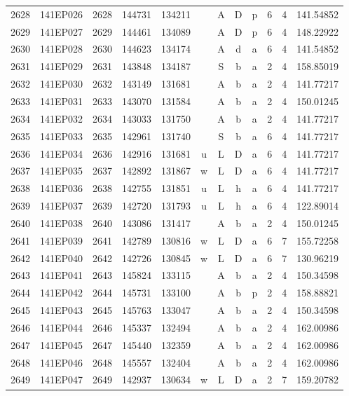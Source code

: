 \begin{tabular}{|*{12}{c|}}
2628 & 141EP026 & 2628 & 144731 & 134211 &  & A & D & p & 6 & 4 & 141.54852 \\ 
2629 & 141EP027 & 2629 & 144461 & 134089 &  & A & D & p & 6 & 4 & 148.22922 \\ 
2630 & 141EP028 & 2630 & 144623 & 134174 &  & A & d & a & 6 & 4 & 141.54852 \\ 
2631 & 141EP029 & 2631 & 143848 & 134187 &  & S & b & a & 2 & 4 & 158.85019 \\ 
2632 & 141EP030 & 2632 & 143149 & 131681 &  & A & b & a & 2 & 4 & 141.77217 \\ 
2633 & 141EP031 & 2633 & 143070 & 131584 &  & A & b & a & 2 & 4 & 150.01245 \\ 
2634 & 141EP032 & 2634 & 143033 & 131750 &  & A & b & a & 2 & 4 & 141.77217 \\ 
2635 & 141EP033 & 2635 & 142961 & 131740 &  & S & b & a & 6 & 4 & 141.77217 \\ 
2636 & 141EP034 & 2636 & 142916 & 131681 & u & L & D & a & 6 & 4 & 141.77217 \\ 
2637 & 141EP035 & 2637 & 142892 & 131867 & w & L & D & a & 6 & 4 & 141.77217 \\ 
2638 & 141EP036 & 2638 & 142755 & 131851 & u & L & h & a & 6 & 4 & 141.77217 \\ 
2639 & 141EP037 & 2639 & 142720 & 131793 & u & L & h & a & 6 & 4 & 122.89014 \\ 
2640 & 141EP038 & 2640 & 143086 & 131417 &  & A & b & a & 2 & 4 & 150.01245 \\ 
2641 & 141EP039 & 2641 & 142789 & 130816 & w & L & D & a & 6 & 7 & 155.72258 \\ 
2642 & 141EP040 & 2642 & 142726 & 130845 & w & L & D & a & 6 & 7 & 130.96219 \\ 
2643 & 141EP041 & 2643 & 145824 & 133115 &  & A & b & a & 2 & 4 & 150.34598 \\ 
2644 & 141EP042 & 2644 & 145731 & 133100 &  & A & b & p & 2 & 4 & 158.88821 \\ 
2645 & 141EP043 & 2645 & 145763 & 133047 &  & A & b & a & 2 & 4 & 150.34598 \\ 
2646 & 141EP044 & 2646 & 145337 & 132494 &  & A & b & a & 2 & 4 & 162.00986 \\ 
2647 & 141EP045 & 2647 & 145440 & 132359 &  & A & b & a & 2 & 4 & 162.00986 \\ 
2648 & 141EP046 & 2648 & 145557 & 132404 &  & A & b & a & 2 & 4 & 162.00986 \\ 
2649 & 141EP047 & 2649 & 142937 & 130634 & w & L & D & a & 2 & 7 & 159.20782 \\ 

\end{tabular}
